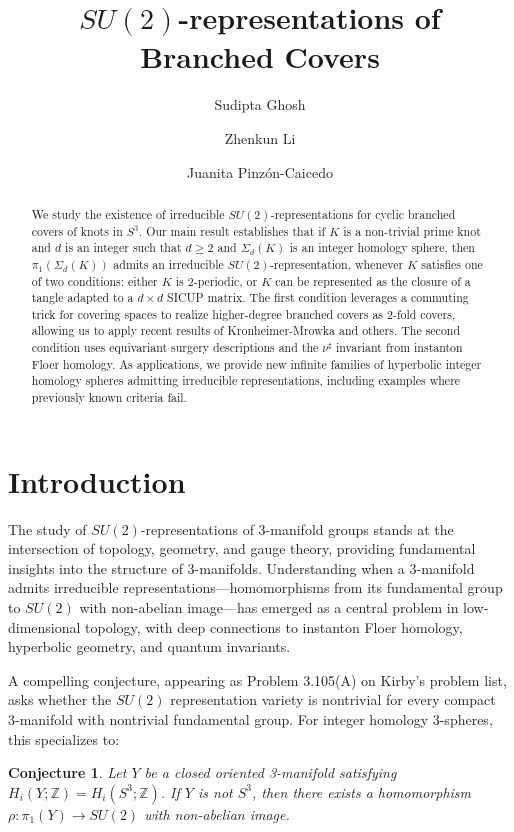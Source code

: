 \documentclass[11pt]{amsart}
\author{Sudipta Ghosh}
\author{Zhenkun Li}
\author{Juanita Pinz\'on-Caicedo}
\title{$SU(2)$-representations of Branched Covers}
\newtheorem{conjecture}[theorem]{Conjecture}
\newcommand{\Z}{\mathbb{Z}}
\begin{document}
\begin{abstract}
We study the existence of irreducible $SU(2)$-representations for cyclic branched covers of knots in $S^3$. Our main result establishes that if $K$ is a non-trivial prime knot and $d$ is an integer such that $d \geq 2$ and $\Sigma_d(K)$ is an integer homology sphere, then $\pi_1(\Sigma_d(K))$ admits an irreducible $SU(2)$-representation, whenever $K$ satisfies one of two conditions: either $K$ is $2$-periodic, or $K$ can be represented as the closure of a tangle adapted to a $d\times d$ SICUP matrix. The first condition leverages a commuting trick for covering spaces to realize higher-degree branched covers as 2-fold covers, allowing us to apply recent results of Kronheimer-Mrowka and others. The second condition uses equivariant surgery descriptions and the $\nu^\sharp$ invariant from instanton Floer homology. As applications, we provide new infinite families of hyperbolic integer homology spheres admitting irreducible representations, including examples where previously known criteria fail.
\end{abstract}
\maketitle

\section{Introduction}

The study of $SU(2)$-representations of 3-manifold groups stands at the intersection of topology, geometry, and gauge theory, providing fundamental insights into the structure of 3-manifolds. Understanding when a 3-manifold admits irreducible representations---homomorphisms from its fundamental group to $SU(2)$ with non-abelian image---has emerged as a central problem in low-dimensional topology, with deep connections to instanton Floer homology, hyperbolic geometry, and quantum invariants.

A compelling conjecture, appearing as Problem 3.105(A) on Kirby's problem list, asks whether the $SU(2)$ representation variety is nontrivial for every compact 3-manifold with nontrivial fundamental group. For integer homology 3-spheres, this specializes to:

\begin{conjecture} Let $Y$ be a closed oriented 3-manifold satisfying $H_i(Y;\Z)=H_i(S^3;\Z)$. If $Y$ is not $S^3$, then there exists a homomorphism $\rho: \pi_1(Y)\to SU(2)$ with non-abelian image.
\end{conjecture}
\end{document}
